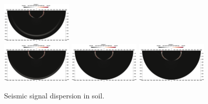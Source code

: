 \documentclass{report}
\begin{document}
\begin{figure}
    \includegraphics[width=0.3\textwidth]{./Images/t10-large.png}\\
    \includegraphics[width=0.3\textwidth]{./Images/t11-large.png}        \includegraphics[width=0.3\textwidth]{./Images/t12-large.png}    
    \includegraphics[width=0.3\textwidth]{./Images/t13-large.png}
    \caption{Seismic signal dispersion in soil.}
    \label{fig:soilsemi}
\end{figure}
\end{document}
